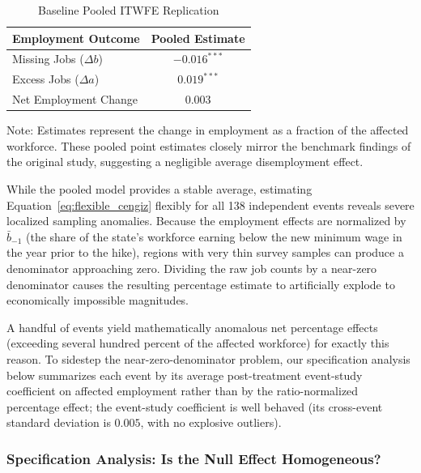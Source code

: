 \documentclass[margin=5in, 12pt]{article}
\newcommand{\1}{\mathbbm{1}}
\begin{document}
\begin{table}[H]
    \centering
    \caption{Baseline Pooled ITWFE Replication}
    \label{tab:baseline_replication}
    \begin{tabular}{lc}
        \toprule
        \textbf{Employment Outcome} & \textbf{Pooled Estimate} \\
        \midrule
        Missing Jobs ($\Delta b$) & $-0.016^{***}$ \\
        Excess Jobs ($\Delta a$) & $0.019^{***}$ \\
        Net Employment Change & $0.003$ \\
        \bottomrule
    \end{tabular}
    \vspace{0.1cm}
    \begin{minipage}{0.7\textwidth}
        \small Note: Estimates represent the change in employment as a fraction of the affected workforce. These pooled point estimates closely mirror the benchmark findings of the original study, suggesting a negligible average disemployment effect.
    \end{minipage}
\end{table}

While the pooled model provides a stable average, estimating Equation~\ref{eq:flexible_cengiz} flexibly for all 138 independent events reveals severe localized sampling anomalies. Because the employment effects are normalized by $\bar{b}_{-1}$ (the share of the state's workforce earning below the new minimum wage in the year prior to the hike), regions with very thin survey samples can produce a denominator approaching zero. Dividing the raw job counts by a near-zero denominator causes the resulting percentage estimate to artificially explode to economically impossible magnitudes.

A handful of events yield mathematically anomalous net percentage effects (exceeding several hundred percent of the affected workforce) for exactly this reason. To sidestep the near-zero-denominator problem, our specification analysis below summarizes each event by its average post-treatment event-study coefficient on affected employment rather than by the ratio-normalized percentage effect; the event-study coefficient is well behaved (its cross-event standard deviation is $0.005$, with no explosive outliers).

\subsubsection{Specification Analysis: Is the Null Effect Homogeneous?}
\label{sec:cengiz:spec}
\end{document}

